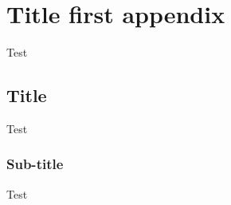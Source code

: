\chapter{Title first appendix}
\label{attachment:a}

Test

\section{Title}
Test

\subsection{Sub-title}
Test